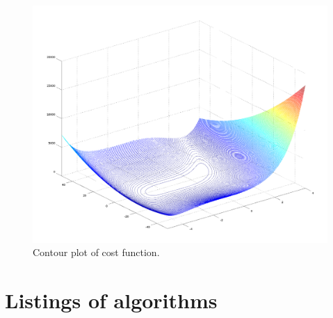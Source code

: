 \documentclass[eng,openany]{mgr}
\begin{document}
\begin{figure}[h]
\centering
\includegraphics[width=0.7\linewidth]{screenshot004}
\caption{Contour plot of cost function.}
\label{fig:screenshot004}
\end{figure}


\clearpage
\chapter{Listings of algorithms}
\end{document}
